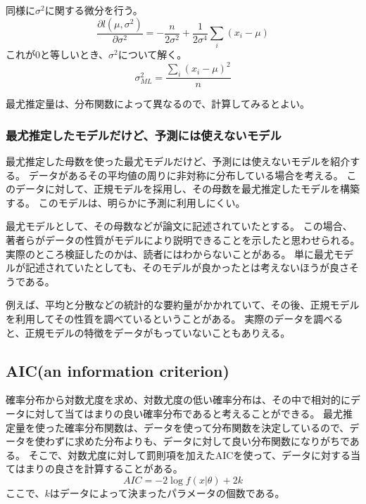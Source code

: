 同様に$\sigma^2$に関する微分を行う。
\begin{equation*}
    \frac{\partial l(\mu,\sigma^2)}{\partial \sigma^2} = -\frac{n}{2\sigma^2}+\frac{1}{2\sigma^4}\sum_i(x_i-\mu)
\end{equation*}
これが$0$と等しいとき、$\sigma^2$について解く。
\begin{equation*}
    \sigma^2_{ML} = \frac{\sum_i(x_i-\mu)^2}{n}
\end{equation*}

最尤推定量は、分布関数によって異なるので、計算してみるとよい。

\subsubsection{最尤推定したモデルだけど、予測には使えないモデル}\label{likelihood_model_unpredictable}
最尤推定した母数を使った最尤モデルだけど、予測には使えないモデルを紹介する。
データがあるその平均値の周りに非対称に分布している場合を考える。
このデータに対して、正規モデルを採用し、その母数を最尤推定したモデルを構築する。
このモデルは、明らかに予測に利用しにくい。

最尤モデルとして、その母数などが論文に記述されていたとする。
この場合、著者らがデータの性質がモデルにより説明できることを示したと思わせられる。
実際のところ検証したのかは、読者にはわからないことがある。
単に最尤モデルが記述されていたとしても、そのモデルが良かったとは考えないほうが良さそうである。

例えば、平均と分散などの統計的な要約量がかかれていて、その後、正規モデルを利用してその性質を調べているということがある。
実際のデータを調べると、正規モデルの特徴をデータがもっていないこともありえる。


\subsection{AIC(an information criterion)}
確率分布から対数尤度を求め、対数尤度の低い確率分布は、その中で相対的にデータに対して当てはまりの良い確率分布であると考えることができる。
最尤推定量を使った確率分布関数は、データを使って分布関数を決定しているので、データを使わずに求めた分布よりも、データに対して良い分布関数になりがちである。
そこで、対数尤度に対して罰則項を加えたAICを使って、データに対する当てはまりの良さを計算することがある。
\begin{equation*}
    AIC = -2\log f(x|\theta)+2k
\end{equation*}
ここで、$k$はデータによって決まったパラメータの個数である。

